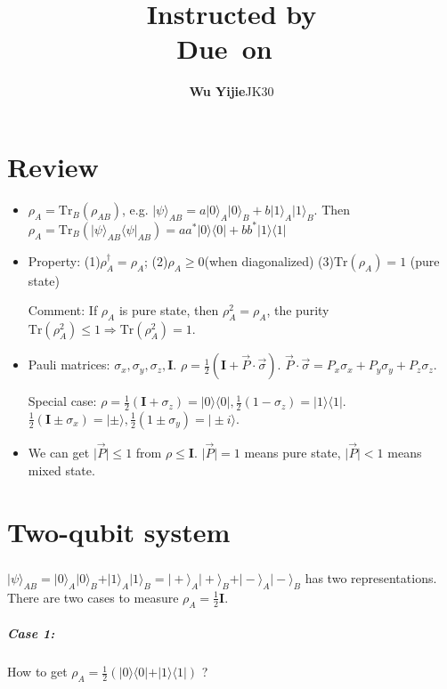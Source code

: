 \documentclass{article}
\title{\textmd{\bf \Class\\ \Title}\\{\large Instructed by \textit{\ClassInstructor}}\\\normalsize\vspace{0.1in}\small{Due\ on\ \DueDate}}
\date{}
\newcommand{\StudentName}{Wu Yijie}
\newcommand{\StudentClass}{JK30}
\newcommand{\StudentNumber}{2013011314}
\newcommand{\Tr}{\mathrm{Tr}}
\newcommand{\bfone}{\mathbf{I}}
\begin{document}
\begin{spacing}{1.2}
\author{\textbf{\StudentName}\qquad\StudentClass\quad\StudentNumber}
\maketitle \thispagestyle{empty}

\section{Review}
\begin{itemize}
\item $\rho_A = \Tr_B(\rho_{AB})$, e.g. $\vert\psi\rangle_{AB} = a\vert 0\rangle_A \vert 0\rangle_B + b \vert 1\rangle_A \vert 1\rangle_B$. Then $\rho_A = \Tr_B(\vert\psi\rangle_{AB}\langle\psi\vert_{AB}) = aa^* \vert 0\rangle \langle 0\vert + bb^*\vert 1\rangle \langle 1\vert$ 
\item Property: (1)$\rho_A^\dagger = \rho_A$; (2)$\rho_A\geq 0$(when diagonalized) (3)$\Tr(\rho_A) =1 $ (pure state)

Comment: If $\rho_A$ is pure state, then $\rho_A^2 = \rho_A$, the purity $\Tr(\rho_A^2)\leq 1 \Rightarrow \Tr(\rho_A^2) =1 $.
\item Pauli matrices: $\sigma_x,\sigma_y,\sigma_z,\mathbf{I}$. $\rho = \frac{1}{2}(\mathbf{I}+\vec{P}\cdot \vec{\sigma})$. $\vec{P}\cdot\vec{\sigma} = P_x\sigma_x + P_y\sigma_y+P_z\sigma_z$.

Special case: $\rho = \frac12 (\bfone+\sigma_z) = \vert 0\rangle \langle 0\vert , \frac12 (1-\sigma_z) = \vert 1\rangle \langle 1\vert$.
$\frac12 (\bfone \pm\sigma_x) = \vert \pm\rangle, \frac12 (1\pm\sigma_y) = \vert \pm i\rangle$.
\item We can get $\vert \vec{P}\vert\leq 1$ from $\rho\leq \bfone$. $\vert \vec{P}\vert = 1 $ means pure state, $\vert \vec{P}\vert<1$ means mixed state.
\end{itemize}
\section{Two-qubit system}
\subparagraph{}
$\vert\psi\rangle_{AB} =  \vert 0\rangle_A \vert 0\rangle_B+\vert 1\rangle_A\vert 1\rangle_B = \vert+\rangle_A\vert +\rangle_B+\vert - \rangle_A\vert -\rangle_B$ has two representations. There are two cases to measure $\rho_A = \frac12 \bfone$.
\subparagraph{Case 1:} How to get $\rho_A = \frac12 ( \vert 0\rangle \langle 0\vert+\vert 1\rangle\langle 1\vert)$ ?
\begin{enumerate}


\end{enumerate}
\end{spacing}
\end{document}

